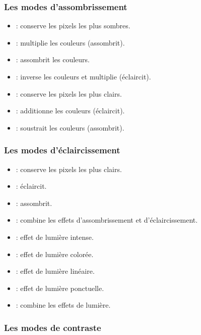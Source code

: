 \subsubsection{Les modes d'assombrissement}

\begin{itemize}
    \item {} : conserve les pixels les plus sombres.
    \item {} : multiplie les couleurs (assombrit).
    \item {} : assombrit les couleurs.
    \item {} : inverse les couleurs et multiplie (éclaircit).
    \item {} : conserve les pixels les plus clairs.
    \item {} : additionne les couleurs (éclaircit).
    \item {} : soustrait les couleurs (assombrit).
\end{itemize}

\subsubsection{Les modes d'éclaircissement}

\begin{itemize}
    \item {} : conserve les pixels les plus clairs.
    \item {} : éclaircit.
    \item {} : assombrit.
    \item {} : combine les effets d'assombrissement et d'éclaircissement.
    \item {} : effet de lumière intense.
    \item {} : effet de lumière colorée.
    \item {} : effet de lumière linéaire.
    \item {} : effet de lumière ponctuelle.
    \item {} : combine les effets de lumière.
\end{itemize}

\subsubsection{Les modes de contraste}

